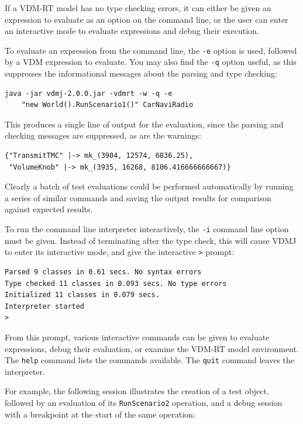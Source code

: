If a VDM-RT model has no type checking errors, it can either be given an
expression to evaluate as an option on the command line, or the user can enter
an interactive mode to evaluate expressions and debug their execution.

To evaluate an expression from the command line, the \verb|-e| option is used,
followed by a VDM expression to evaluate. You may also find the \verb|-q|
option useful, as this suppresses the informational messages about the parsing
and type checking:

\begin{lstlisting}
java -jar vdmj-2.0.0.jar -vdmrt -w -q -e 
    "new World().RunScenario1()" CarNaviRadio
\end{lstlisting}

\noindent This produces a single line of output for the evaluation, since the
parsing and checking messages are suppressed, as are the warnings:

\begin{lstlisting}
{"TransmitTMC" |-> mk_(3904, 12574, 6836.25),
 "VolumeKnob" |-> mk_(3935, 16268, 8106.416666666667)}
\end{lstlisting}

Clearly a batch of test evaluations could be performed automatically by running
a series of similar commands and saving the output results for comparison
against expected results.

To run the command line interpreter interactively, the \verb|-i| command line
option must be given. Instead of terminating after the type check, this will
cause VDMJ to enter its interactive mode, and give the interactive \verb|>|
prompt:

\begin{lstlisting}
Parsed 9 classes in 0.61 secs. No syntax errors
Type checked 11 classes in 0.093 secs. No type errors
Initialized 11 classes in 0.079 secs. 
Interpreter started
>
\end{lstlisting}

\noindent From this prompt, various interactive commands can be given to
evaluate expressions, debug their evaluation, or examine the VDM-RT model environment.
The \verb|help| command lists the commands available. The \verb|quit| command
leaves the interpreter.

For example, the following session illustrates the creation of a test object,
followed by an evaluation of its \verb|RunScenario2| operation, and a debug
session with a breakpoint at the start of the same operation:

